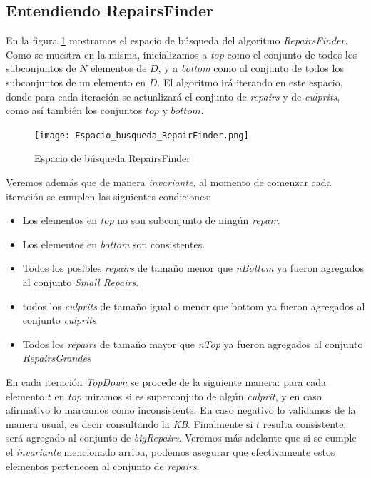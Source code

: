 \documentclass[11pt,a4paper,twoside]{tesis}
\begin{document}
\subsection{Entendiendo RepairsFinder}

En la figura \ref{fig:espacio_busqueda_repair_finder} mostramos el espacio de búsqueda del algoritmo \textit{RepairsFinder}. Como se muestra en la misma, inicializamos a \textit{top} como el conjunto de todos los subconjuntos de $N$ elementos de $D$, y a \textit{bottom} como al conjunto de todos los subconjuntos de un elemento en $D$. El algoritmo irá iterando en este espacio, donde para cada iteración se actualizará el conjunto de \textit{repairs} y de \textit{culprits}, como así también los conjuntos $top$ y $bottom$. 



\begin{figure}[ht]
    \texttt{[image: Espacio\_busqueda\_RepairFinder.png]}
    \centering
    \caption{Espacio de búsqueda RepairsFinder}
    \label{fig:espacio_busqueda_repair_finder}
\end{figure}

Veremos además que de manera \textit{invariante}, al momento de comenzar cada iteración se cumplen las siguientes condiciones:

\begin{itemize}
    \item Los elementos en \textit{top} no son subconjunto de ningún \textit{repair}.
    \item Los elementos en \textit{bottom} son consistentes.
    \item Todos los posibles \textit{repairs} de tamaño menor que \textit{nBottom} ya fueron agregados al conjunto \textit{Small Repairs}.
    \item todos los \textit{culprits} de tamaño igual o menor que bottom ya fueron agregados al conjunto \textit{culprits}
    \item Todos los \textit{repairs} de tamaño mayor que \textit{nTop} ya fueron agregados al conjunto \textit{RepairsGrandes}
\end{itemize}

En cada iteración \textit{TopDown} se procede de la siguiente manera: para cada elemento $t$ en \textit{top} miramos si es superconjuto de algún \textit{culprit}, y en caso afirmativo lo marcamos como inconsistente. En caso negativo lo validamos de la manera usual, es decir consultando la \textit{KB}. Finalmente si $t$ resulta consistente, será agregado al conjunto de \textit{bigRepairs}. Veremos más adelante que si se cumple el \textit{invariante} mencionado arriba, podemos asegurar que efectivamente estos elementos pertenecen al conjunto de \textit{repairs}. 
\end{document}

